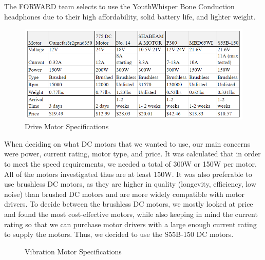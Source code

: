 \noindent The FORWARD team selects to use the YouthWhisper Bone Conduction headphones due to their high affordability, solid battery life, and lighter weight. \\

\begin{figure}[H]
	\centering
	\includegraphics[width=1\textwidth]{./Images/drive_motors.png}
	\caption{\label{fig:drive_motors}Drive Motor Specifications}
\end{figure}


\noindent When deciding on what DC motors that we wanted to use, our main concerns were power, current rating, motor type, and price. It was calculated that in order to meet the speed requirements, we needed a total of 300W or 150W per motor. All of the motors investigated thus are at least 150W. It was also preferable to use brushless DC motors, as they are higher in quality (longevity, efficiency, low noise) than brushed DC motors and are more widely compatible with motor drivers. To decide between the brushless DC motors, we mostly looked at price and found the most cost-effective motors, while also keeping in mind the current rating so that we can purchase motor drivers with a large enough current rating to supply the motors. Thus, we decided to use the S55B-150 DC motors. \cite{yzl1} \cite{Citphto} \cite{AliExpress1} \cite{AliExpress2} \cite{AliExpress3} \cite{PrecisionMicrodrives} \cite {AliExpress8}\\

\begin{figure}[H]
	\centering
	\setlength{\tabcolsep}{5pt} %
	\renewcommand{\arraystretch}{1.75} %
	\caption{\label{fig:vibrationMotorSpecifications}Vibration Motor Specifications}
\end{figure}

